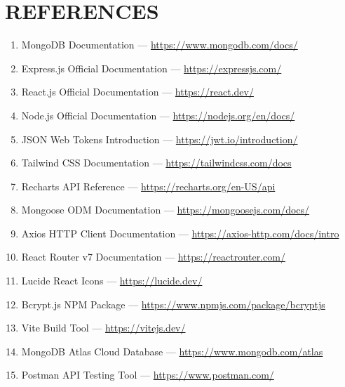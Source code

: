 \documentclass[12pt,a4paper]{report}
\begin{document}
\chapter*{REFERENCES}
\begin{enumerate}
    \item MongoDB Documentation --- \url{https://www.mongodb.com/docs/}
    \item Express.js Official Documentation --- \url{https://expressjs.com/}
    \item React.js Official Documentation --- \url{https://react.dev/}
    \item Node.js Official Documentation --- \url{https://nodejs.org/en/docs/}
    \item JSON Web Tokens Introduction --- \url{https://jwt.io/introduction/}
    \item Tailwind CSS Documentation --- \url{https://tailwindcss.com/docs}
    \item Recharts API Reference --- \url{https://recharts.org/en-US/api}
    \item Mongoose ODM Documentation --- \url{https://mongoosejs.com/docs/}
    \item Axios HTTP Client Documentation --- \url{https://axios-http.com/docs/intro}
    \item React Router v7 Documentation --- \url{https://reactrouter.com/}
    \item Lucide React Icons --- \url{https://lucide.dev/}
    \item Bcrypt.js NPM Package --- \url{https://www.npmjs.com/package/bcryptjs}
    \item Vite Build Tool --- \url{https://vitejs.dev/}
    \item MongoDB Atlas Cloud Database --- \url{https://www.mongodb.com/atlas}
    \item Postman API Testing Tool --- \url{https://www.postman.com/}
\end{enumerate}
\end{document}
